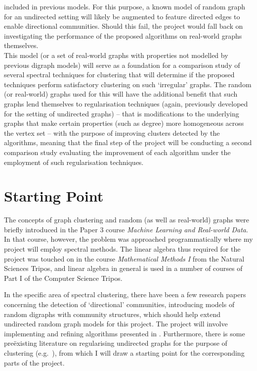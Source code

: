 \documentclass[a4paper,12pt]{article}
\begin{document}
	included in previous models. For this purpose, a known model of random graph for an 
	undirected setting will 
	likely be augmented to feature directed edges to enable directional communities. Should 
	this fail, the project would fall back on investigating the performance of the proposed 
	algorithms on real-world graphs themselves.\\
	This model (or a set of real-world graphs with properties not modelled by previous digraph 
	models) will serve as a foundation for a comparison study of several spectral 
	techniques for clustering that will determine if the proposed techniques perform 
	satisfactory clustering on such `irregular' graphs. The random (or real-world) graphs used for this will have 
	the additional benefit that such graphs lend themselves to regularisation techniques 
	(again, previously developed for the setting of undirected graphs) -- that is modifications 
	to the underlying graphs that make certain properties (such as degree) more homogeneous 
	across the vertex set -- with the purpose of improving clusters detected by the algorithms,
	meaning that 
	the final step of the project will be conducting a second comparison study evaluating the 
	improvement of each algorithm under the employment of such regularisation techniques. 

\section*{Starting Point}
	The concepts of graph clustering and random (as well as real-world) graphs were briefly 
	introduced in the Paper 3 course \emph{Machine Learning and Real-world Data}. In that 
	course, however, the problem was approached programmatically where my project will employ 
	spectral methods. The linear algebra thus required for the project was touched on in the 
	course \emph{Mathematical Methods I} from the Natural Sciences Tripos, and linear algebra 
	in general is used in a number of courses of Part I of the Computer Science Tripos. 
	\par
	In the specific area of spectral clustering, there have been a few research papers 
	concerning the detection of `directional' communities, introducing models of random 
	digraphs with community structures, which should help extend undirected random graph models for this project. 
	The project will involve implementing and refining algorithms presented in \cite{lucapaper,
	disimpaper}. 
	Furthermore, there is some pre\"existing literature on regularising undirected graphs for 
	the purpose of clustering (e.g.\ \cite{rohereg, binyureg}), 
	from which I will draw a starting point for the corresponding 
	parts of the project.
\end{document}
